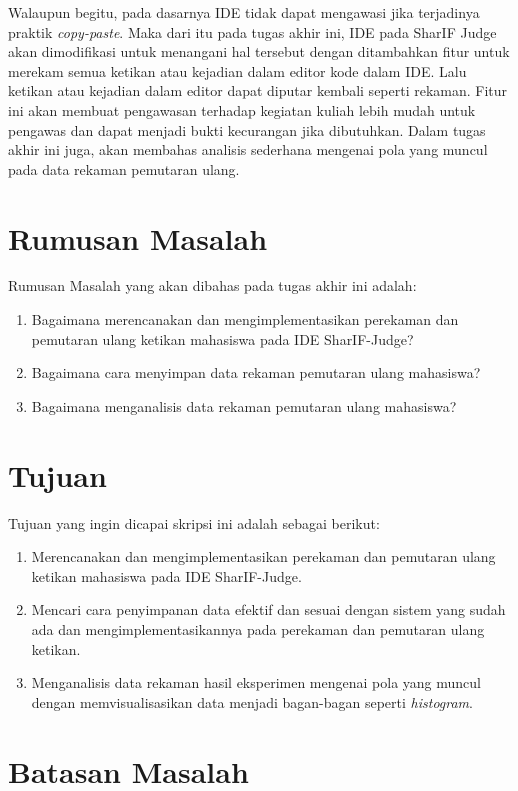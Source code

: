 Walaupun begitu, pada dasarnya IDE tidak dapat mengawasi jika terjadinya praktik \textit{copy-paste}. Maka dari itu pada tugas akhir ini, IDE pada SharIF Judge akan dimodifikasi untuk menangani hal tersebut dengan ditambahkan fitur untuk merekam semua ketikan atau kejadian dalam editor kode dalam IDE. Lalu ketikan atau kejadian dalam editor dapat diputar kembali seperti rekaman. Fitur ini akan membuat pengawasan terhadap kegiatan kuliah lebih mudah untuk pengawas dan dapat menjadi bukti kecurangan jika dibutuhkan. Dalam tugas akhir ini juga, akan membahas analisis sederhana mengenai pola yang muncul pada data rekaman pemutaran ulang.

\section{Rumusan Masalah}
\label{sec:1:rumusan}

Rumusan Masalah yang akan dibahas pada tugas akhir ini adalah:
\begin{enumerate}
    \item Bagaimana merencanakan dan mengimplementasikan perekaman dan pemutaran ulang ketikan mahasiswa pada IDE SharIF-Judge?
    \item Bagaimana cara menyimpan data rekaman pemutaran ulang mahasiswa?
    \item Bagaimana menganalisis data rekaman pemutaran ulang mahasiswa?
\end{enumerate}

\section{Tujuan}
\label{sec:1:tujuan}

Tujuan yang ingin dicapai skripsi ini adalah sebagai berikut:
\begin{enumerate}
    \item Merencanakan dan mengimplementasikan perekaman dan pemutaran ulang ketikan mahasiswa pada IDE SharIF-Judge.
    \item Mencari cara penyimpanan data efektif dan sesuai dengan sistem yang sudah ada dan mengimplementasikannya pada perekaman dan pemutaran ulang ketikan.
    \item Menganalisis data rekaman hasil eksperimen mengenai pola yang muncul dengan memvisualisasikan data menjadi bagan-bagan seperti \textit{histogram}. 
\end{enumerate}

\section{Batasan Masalah}
\label{sec:1:batasan}

